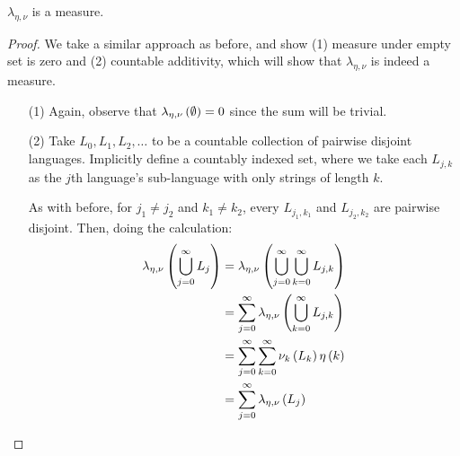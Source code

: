 \begin{theorem}
  \(\lambda_{\eta, \nu}\) is a measure.
\end{theorem}
\begin{proof}
  We take a similar approach as before, and show
  (1) measure under empty set is zero and
  (2) countable additivity,
  which will show that \(\lambda_{\eta, \nu}\) is indeed a measure.

  \begin{enumerate}
    \item[(1)]
      Again, observe that \(\lambda_{\eta, \nu} \left(\emptyset\right) = 0\)
      since the sum will be trivial.

    \item[(2)]
      Take \(L_0, L_1, L_2, \ldots\) to be a countable collection of
      pairwise disjoint languages.
      Implicitly define a countably indexed set,
      where we take each \(L_{j, k}\) as the \(j\)th language's
      sub-language with only strings of length \(k\).

      As with before, for \(j_1 \neq j_2\) and \(k_1 \neq k_2\),
      every \(L_{j_1, k_1}\) and \(L_{j_2, k_2}\) are pairwise disjoint.
      Then, doing the calculation:
      \begin{align*}
        \lambda_{\eta, \nu} \left(\bigcup_{j = 0}^{\infty} L_j\right)
          &= \lambda_{\eta, \nu} \left(\bigcup_{j = 0}^{\infty}
                            \bigcup_{k = 0}^{\infty} L_{j, k}\right) \\
          &= \sum_{j = 0}^{\infty}
              \lambda_{\eta, \nu} \left(\bigcup_{k = 0}^{\infty} L_{j, k}\right) \\
          &= \sum_{j = 0}^{\infty}
              \sum_{k = 0}^{\infty}
                \nu_k \left(L_k\right) \eta\left(k\right) \\
          &= \sum_{j = 0}^{\infty} \lambda_{\eta, \nu} \left(L_j\right)
        \end{align*}
  \end{enumerate}
\end{proof}

